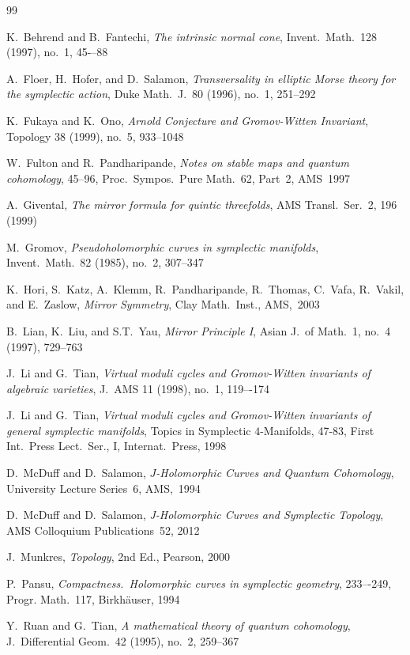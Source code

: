 \documentclass[11pt]{article}
\numberwithin{equation}{section}
\theoremstyle{definition}
\begin{document}
\begin{thebibliography}{99}

 K.~Behrend and B.~Fantechi,  
{\it The intrinsic normal cone}, Invent.~Math.~128 (1997), no.~1, 45-–88

 A.~Floer, H.~Hofer, and D.~Salamon, 
{\it Transversality in elliptic Morse theory for the symplectic action},
Duke Math.~J.~80 (1996), no.~1, 251--292

 K.~Fukaya and K.~Ono,
{\it Arnold Conjecture and Gromov-Witten Invariant},
Topology 38 (1999), no.~5, 933--1048

 W.~Fulton and R.~Pandharipande, 
{\it Notes on stable maps and quantum cohomology}, 45--96,  
Proc.~Sympos.~Pure Math.~62, Part~2, AMS~1997

 A.~Givental, 
{\it The mirror formula for quintic threefolds}, 
AMS Transl.~Ser.~2, 196 (1999)

 M.~Gromov,
{\it Pseudoholomorphic curves in symplectic manifolds},
Invent.~Math.~82 (1985), no.~2, 307--347

 K.~Hori, S.~Katz, A.~Klemm, R.~Pandharipande,
R.~Thomas, C.~Vafa, R.~Vakil, and E.~Zaslow, {\it Mirror Symmetry},
Clay Math.~Inst., AMS,~2003

 B.~Lian, K.~Liu, and S.T.~Yau, 
{\it Mirror Principle I}, Asian J.~of Math.~1, no.~4 (1997), 729--763


  J.~Li and G.~Tian,
{\it Virtual moduli cycles and Gromov-Witten invariants of algebraic varieties},
J.~AMS 11 (1998), no.~1, 119–-174

  J.~Li and G.~Tian, 
{\it Virtual moduli cycles and Gromov-Witten invariants of general symplectic manifolds}, 
Topics in Symplectic \hbox{$4$-Manifolds},
47-83, First Int.~Press Lect.~Ser., I, Internat.~Press, 1998

 D.~McDuff and D.~Salamon, 
{\it $J$-Holomorphic Curves and Quantum Cohomology},
University Lecture Series~6, AMS,~1994

 D.~McDuff and D.~Salamon, 
{\it J-Holomorphic Curves and Symplectic Topology},
AMS Colloquium Publications~52, 2012

  J.~Munkres, {\it Topology}, 2nd Ed., Pearson, 2000

 P.~Pansu, 
{\it Compactness.~Holomorphic curves in symplectic geometry}, 
233–-249, Progr. Math.~117, Birkh\"auser, 1994

 Y.~Ruan and G.~Tian, 
{\it A mathematical theory of quantum cohomology}, 
J.~Differential Geom.~42 (1995), no.~2, 259--367


\end{thebibliography}
\end{document}

